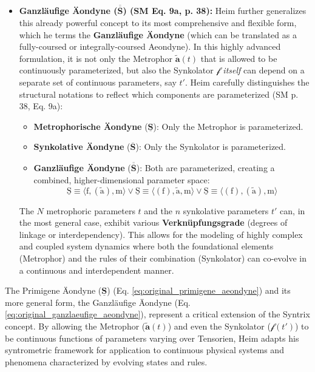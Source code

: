 \documentclass[12pt]{article}
\newcommand{\metrophor}{\bm{\widetilde{a}}}
\newcommand{\synkolator}{\mathcal{f}}
\begin{document}
\begin{itemize}
    \item \textbf{Ganzläufige Äondyne (\( \overline{\overline{\bm{S}}} \)) (SM Eq. 9a, p. 38):}
    Heim further generalizes this already powerful concept to its most comprehensive and flexible form, which he terms the \textbf{Ganzläufige \"{A}ondyne} (which can be translated as a fully-coursed or integrally-coursed Aeondyne). In this highly advanced formulation, it is not only the Metrophor \( \metrophor(t) \) that is allowed to be continuously parameterized, but also the Synkolator \( \synkolator \) \textit{itself} can depend on a separate set of continuous parameters, say \( t' \). 
    Heim carefully distinguishes the structural notations to reflect which components are parameterized (SM p. 38, Eq. 9a):
    \begin{itemize}
        \item \textbf{Metrophorische Äondyne} (\( \underline{\bm{S}} \)): Only the Metrophor is parameterized.
        \item \textbf{Synkolative Äondyne} (\( \overline{\bm{S}} \)): Only the Synkolator is parameterized.
        \item \textbf{Ganzläufige Äondyne} (\( \overline{\overline{\bm{S}}} \)): Both are parameterized, creating a combined, higher-dimensional parameter space:
        \begin{equation}
        \underline{\mathrm{S}} \equiv \langle \mathrm{f}, (\tilde{\mathrm{a}}), \mathrm{m} \rangle \lor \underline{\mathrm{S}} \equiv \langle (\mathrm{f}), \tilde{\mathrm{a}}, \mathrm{m} \rangle \lor \underline{\mathrm{S}} \equiv \langle (\mathrm{f}), (\tilde{\mathrm{a}}), \mathrm{m} \rangle \tag{9a}
        \label{eq:original_ganzlaeufige_aeondyne}
        \end{equation}
    \end{itemize}
    The \( N \) metrophoric parameters \( t \) and the \( n \) synkolative parameters \( t' \) can, in the most general case, exhibit various \textbf{Verknüpfungsgrade} (degrees of linkage or interdependency). This allows for the modeling of highly complex and coupled system dynamics where both the foundational elements (Metrophor) and the rules of their combination (Synkolator) can co-evolve in a continuous and interdependent manner.
\end{itemize}

The Primigene Äondyne (\(\underline{\bm{S}}\)) (Eq. \eqref{eq:original_primigene_aeondyne}) and its more general form, the Ganzläufige Äondyne (Eq. \eqref{eq:original_ganzlaeufige_aeondyne}), represent a critical extension of the Syntrix concept. By allowing the Metrophor (\(\metrophor(t)\)) and even the Synkolator (\(\synkolator(t')\)) to be continuous functions of parameters varying over Tensorien, Heim adapts his syntrometric framework for application to continuous physical systems and phenomena characterized by evolving states and rules.
\end{document}
